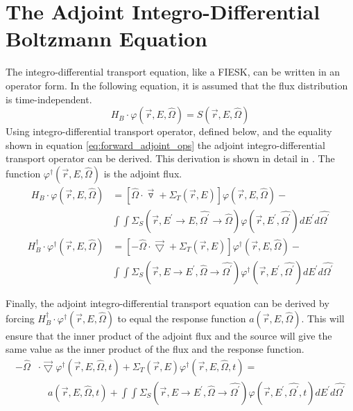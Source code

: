 \section{The Adjoint Integro-Differential Boltzmann Equation}
The integro-differential transport equation, like a FIESK, can be written in an
operator form. In the following equation, it is assumed that the flux 
distribution is time-independent.
\begin{equation}
  H_B \cdot \varphi(\vec{r},E,\hat{\Omega}) = S(\vec{r},E,\hat{\Omega})
\end{equation}
Using integro-differential transport operator, defined below, and the equality
shown in equation \ref{eq:forward_adjoint_ops} the adjoint integro-differential
transport operator can be derived. This derivation is shown in detail in 
\citep{lewis}. The function $\varphi^{\dagger}(\vec{r},E,\hat{\Omega})$ is the
adjoint flux.
\begin{equation}
  \begin{split}
    H_B \cdot \varphi(\vec{r},E,\hat{\Omega}) &= 
    \left[ \hat{\Omega} \cdot \vec{\triangledown} +
     \Sigma_T(\vec{r},E) \right] \varphi(\vec{r},E,\hat{\Omega}) - \\
     & \int\int \Sigma_S(\vec{r},E^{'} \to E,\hat{\Omega^{'}} \to \hat{\Omega})
    \varphi(\vec{r},E^{'},\hat{\Omega^{'}}) dE^{'} d\hat{\Omega^{'}}
  \end{split}
  \label{eq:integro_diff_trans_op}
\end{equation}
\begin{equation}
  \begin{split}
    H_B^{\dagger} \cdot \varphi^{\dagger}(\vec{r},E,\hat{\Omega}) &= 
    \left[ -\hat{\Omega} \cdot \vec{\bigtriangledown} +
     \Sigma_T(\vec{r},E) \right] \varphi^{\dagger}(\vec{r},E,\hat{\Omega}) - \\
     & \int\int \Sigma_S(\vec{r},E \to E^{'},\hat{\Omega} \to \hat{\Omega^{'}})
    \varphi^{\dagger}(\vec{r},E^{'},\hat{\Omega^{'}}) dE^{'} d\hat{\Omega^{'}}
  \end{split}
  \label{eq:integro_diff_adj_trans_op}
\end{equation}

Finally, the adjoint integro-differential transport equation can be derived by
forcing $H_B^{\dagger} \cdot \varphi^{\dagger}(\vec{r},E,\hat{\Omega})$ to equal
the response function $a(\vec{r},E,\hat{\Omega})$. This will ensure that the
inner product of the adjoint flux and the source will give the same value as
the inner product of the flux and the response function.
\begin{equation}
  \begin{split}
    -\hat{\Omega} &\cdot \vec{\bigtriangledown} 
    \varphi^{\dagger}(\vec{r},E,\hat{\Omega},t)
    + \Sigma_T(\vec{r},E) \varphi^{\dagger}(\vec{r},E,\hat{\Omega},t) = \\
    & \quad a(\vec{r},E,\hat{\Omega},t) +
    \int\int \Sigma_S(\vec{r},E \to E^{'},\hat{\Omega} \to \hat{\Omega^{'}})
    \varphi(\vec{r},E^{'},\hat{\Omega^{'}},t) dE^{'}d\hat{\Omega^{'}} 
  \end{split}
  \label{eq:integro_diff_adj_boltzmann_eqn}
\end{equation}

